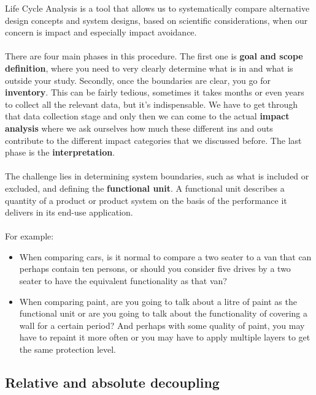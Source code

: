 \documentclass[../summary.tex]{subfiles}
\begin{document}
	Life Cycle Analysis is a tool that allows us to systematically compare alternative design concepts and system designs, based on scientific considerations, when our concern is impact and especially impact avoidance.
	\\\\
	There are four main phases in this procedure. The first one is \textbf{goal and scope definition}, where you need to very clearly determine what is in and what is outside your study. Secondly, once the boundaries are clear, you go for \textbf{inventory}. This can be fairly tedious, sometimes it takes months or even years to collect all the relevant data, but it’s indispensable. We have to get through that data collection stage and only then we can come to the actual \textbf{impact analysis} where we ask ourselves how much these different ins and outs contribute to the different impact categories that we discussed before. The last phase is the \textbf{interpretation}.
	\\\\
	The challenge lies in determining system boundaries, such as what is included or excluded, and defining the \textbf{functional unit}. A functional unit describes a quantity of a product or product system on the basis of the performance it delivers in its end-use application.
	\\\\
	For example:
	\begin{itemize}
		\item When comparing cars, is it normal to compare a two seater to a van that can perhaps contain ten persons, or should you consider five drives by a two seater to have the equivalent functionality as that van?
		\item When comparing paint, are you going to talk about a litre of paint as the functional unit or are you going to talk about the functionality of covering a wall for a certain period? And perhaps with some quality of paint, you may have to repaint it more often or you may have to apply multiple layers to get the same protection level.
	\end{itemize}
	
	
	\subsection{Relative and absolute decoupling}
	
\end{document}
